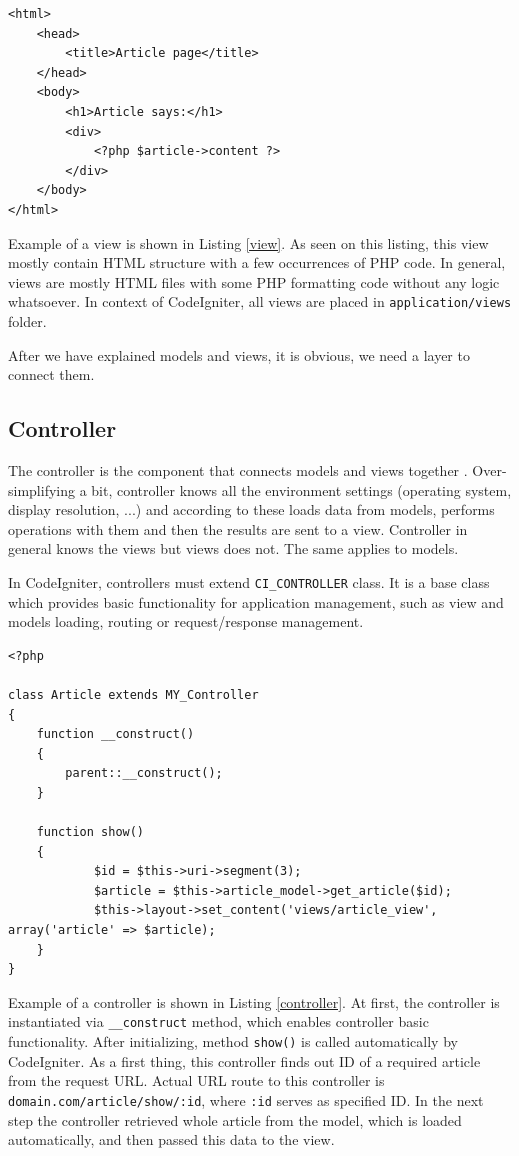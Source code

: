 \begin{lstlisting}[label={view}, caption={Article view}]
<html>
	<head>
		<title>Article page</title>
	</head>
	<body>
		<h1>Article says:</h1>
		<div>
			<?php $article->content ?>
		</div>
	</body>
</html>
\end{lstlisting}

Example of a view is shown in Listing \ref{view}.  As seen on this listing, this view mostly contain HTML structure with a few occurrences of PHP code. In general, views are mostly HTML files with some PHP formatting code without any logic whatsoever. In context of CodeIgniter, all views are placed in \texttt{application/views} folder.

After we have explained models and views, it is obvious, we need a layer to connect them.

\subsection{Controller}
The controller is the component that connects models and views together \cite{phpmvc}. Over-simplifying a bit, controller knows all the environment settings (operating system, display resolution, ...) and according to these loads data from models, performs operations with them and then the results are sent to a view. Controller in general knows the views but views does not. The same applies to models.

In CodeIgniter, controllers must extend \texttt{CI\_CONTROLLER} class. It is a base class which provides basic functionality for application management, such as view and models loading, routing or request/response management.

\begin{lstlisting}[label={controller}, caption={Article controller}]
<?php

class Article extends MY_Controller
{
    function __construct()
    {
        parent::__construct();
    }

    function show()
    {
    		$id = $this->uri->segment(3);
    		$article = $this->article_model->get_article($id);
    		$this->layout->set_content('views/article_view', array('article' => $article);
    }
}
\end{lstlisting}


Example of a controller is shown in Listing \ref{controller}. At first, the controller is instantiated via \texttt{\_\_construct} method, which enables controller basic functionality. After initializing, method \texttt{show()} is called automatically by CodeIgniter. As a first thing, this controller finds out ID of a required article from the request URL. Actual URL route to this controller is \texttt{domain.com/article/show/:id}, where \texttt{:id} serves as specified ID. In the next step the controller retrieved whole article from the model, which is loaded automatically, and then passed this data to the view.
